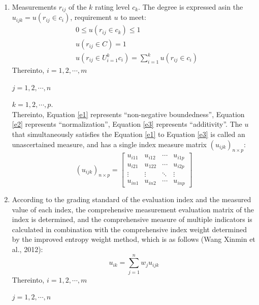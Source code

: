 \documentclass[12pt]{article}  %
\begin{document}
\begin{enumerate}
    \renewcommand{\labelenumi}{\textbf{Step \theenumi}}
    \item Measurements $r_{ij}$ of the $k$ rating level $c_k$. The degree is expressed asin the $u_{ijk}=u(r_{ij}\in c_i)$, requirement $u$ to meet:
\begin{eqnarray}
    &0\le u(r_{ij}\in c_k)\le 1
    \label{e1}\\
    &u(r_{ij}\in C)=1
    \label{e2}\\
    &u(r_{ij}\in U_{i=1}^kc_i)=\sum_{i=1}^{k}u(r_{ij}\in c_i)\label{e3}
\end{eqnarray}
Thereinto, $i=1,2,\cdots ,m$

\hspace{4.25em}$j=1,2,\cdots ,n$

\hspace{4.25em}$k=1,2,\cdots ,p$.\\
Thereinto, Equation \ref{e1} represents ``non-negative boundedness'', Equation \ref{e2} represents ``normalization'', Equation \ref{e3} represents ``additivity''. The $u$ that simultaneously satisfies the Equation \ref{e1} to Equation \ref{e3} is called an unascertained measure, and has a single index measure matrix $(u_{ijk})_{n\times p}$:
\begin{equation}
    (u_{ijk})_{n\times p}=\begin{bmatrix}
  u_{i11}&u_{i12}  &\cdots  &u_{i1p} \\
 u_{i21} &u_{122}  &\cdots  &u_{i2p} \\
\vdots  & \vdots   & \ddots &\vdots  \\
  u_{in1}&u_{in2}  &\cdots  &u_{inp}
\end{bmatrix}
\end{equation}
\item According to the grading standard of the evaluation index and the measured value of each index, the comprehensive measurement evaluation matrix of the index is determined, and the comprehensive measure of multiple indicators is calculated in combination with the comprehensive index weight determined by the improved entropy weight method, which is as follows (Wang Xinmin et al., 2012):
\begin{equation}
    u_{ik}=\sum_{j=1}^{n}w_ju_{ijk}
\end{equation}
Thereinto, $i=1,2,\cdots ,m$

\hspace{4.25em}$j=1,2,\cdots ,n$


\end{enumerate}
\end{document}
